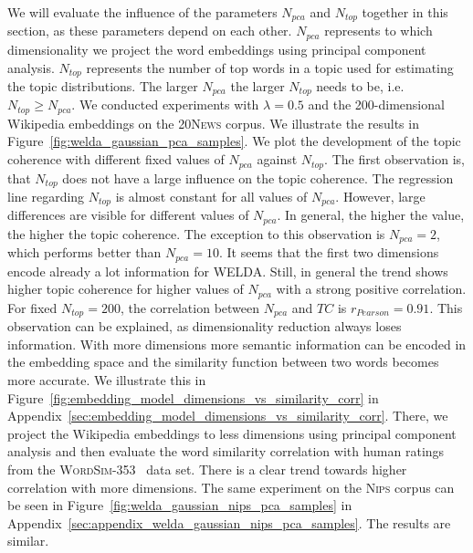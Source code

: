\documentclass[
        a4paper,
        titlepage,
        twoside,
        parskip,
        numbers=noenddot
        ]{scrbook}
\theoremstyle{break}
\begin{document}
We will evaluate the influence of the parameters $N_{pca}$ and $N_{top}$ together in this section, as these parameters depend on each other.
$N_{pca}$ represents to which dimensionality we project the word embeddings using principal component analysis.
$N_{top}$ represents the number of top words in a topic used for estimating the topic distributions.
The larger $N_{pca}$ the larger $N_{top}$ needs to be, i.e. $N_{top} \geq N_{pca}$.
We conducted experiments with $\lambda = 0.5$ and the 200-dimensional Wikipedia embeddings on the \textsc{20News} corpus.
We illustrate the results in Figure~\ref{fig:welda_gaussian_pca_samples}.
We plot the development of the topic coherence with different fixed values of $N_{pca}$ against $N_{top}$.
The first observation is, that $N_{top}$ does not have a large influence on the topic coherence.
The regression line regarding $N_{top}$ is almost constant for all values of $N_{pca}$.
However, large differences are visible for different values of $N_{pca}$.
In general, the higher the value, the higher the topic coherence.
The exception to this observation is $N_{pca} = 2$, which performs better than $N_{pca} = 10$.
It seems that the first two dimensions encode already a lot information for WELDA.
Still, in general the trend shows higher topic coherence for higher values of $N_{pca}$ with a strong positive correlation.
For fixed $N_{top} = 200$, the correlation between $N_{pca}$ and $TC$ is $r_{Pearson} = 0.91$.
This observation can be explained, as dimensionality reduction always loses information.
With more dimensions more semantic information can be encoded in the embedding space and the similarity function between two words becomes more accurate.
We illustrate this in Figure~\ref{fig:embedding_model_dimensions_vs_similarity_corr} in Appendix~\ref{sec:embedding_model_dimensions_vs_similarity_corr}.
There, we project the Wikipedia embeddings to less dimensions using principal component analysis and then evaluate the word similarity correlation with human ratings from the \textsc{WordSim-353}~\cite{Agirre2009} data set.
There is a clear trend towards higher correlation with more dimensions.
The same experiment on the \textsc{Nips} corpus can be seen in Figure~\ref{fig:welda_gaussian_nips_pca_samples} in Appendix~\ref{sec:appendix_welda_gaussian_nips_pca_samples}.
The results are similar.
\end{document}
